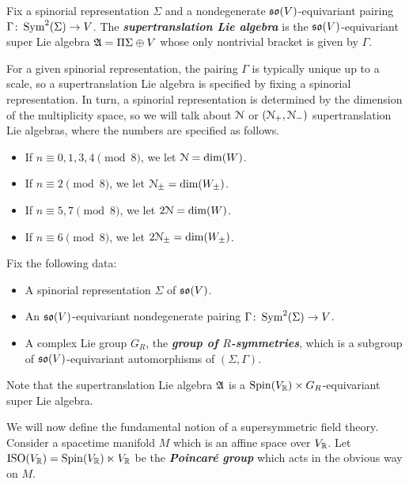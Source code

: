 \documentclass[10pt, oneside]{article}
\newcommand{\defterm}[1]{\textbf{\emph{#1}}}
\begin{document}
\begin{definition}
Fix a spinorial representation $\Sigma$ and a nondegenerate $\mathfrak{so}(V)$-equivariant pairing $\Gamma\colon \operatorname{Sym}^2(\Sigma)\rightarrow V$. The \defterm{supertranslation Lie algebra} is the $\mathfrak{so}(V)$-equivariant super Lie algebra $\mathfrak A = \Pi\Sigma\oplus V$ whose only nontrivial bracket is given by $\Gamma$.
\end{definition}

For a given spinorial representation, the pairing $\Gamma$ is typically unique up to a scale, so a supertranslation Lie algebra is specified by fixing a spinorial representation. In turn, a spinorial representation is determined by the dimension of the multiplicity space, so we will talk about $\mathcal{N}$ or $(\mathcal{N}_+, \mathcal{N}_-)$ supertranslation Lie algebras, where the numbers are specified as follows.
\begin{itemize}
\item If $n\equiv 0, 1, 3, 4\pmod 8$, we let $\mathcal{N} = \dim(W)$.

\item If $n\equiv 2 \pmod 8$, we let $\mathcal{N}_{\pm}=\dim(W_{\pm})$.

\item If $n\equiv 5, 7\pmod 8$, we let $2\mathcal{N} = \dim(W)$.

\item If $n\equiv 6\pmod 8$, we let $2\mathcal{N}_{\pm} = \dim(W_{\pm})$.
\end{itemize}

Fix the following data:
\begin{itemize}
\item A spinorial representation $\Sigma$ of $\mathfrak{so}(V)$.

\item An $\mathfrak{so}(V)$-equivariant nondegenerate pairing $\Gamma\colon \operatorname{Sym}^2(\Sigma)\rightarrow V$.

\item A complex Lie group $G_R$, the \defterm{group of $R$-symmetries}, which is a subgroup of $\mathfrak{so}(V)$-equivariant automorphisms of $(\Sigma, \Gamma)$.
\end{itemize}

Note that the supertranslation Lie algebra $\mathfrak A$ is a $\mathrm{Spin}(V_\mathbb R)\times G_R$-equivariant super Lie algebra.

We will now define the fundamental notion of a supersymmetric field theory.  Consider a spacetime manifold $M$ which is an affine space over $V_\mathbb R$. Let $\mathrm{ISO}(V_\mathbb R) = \mathrm{Spin}(V_\mathbb R)\ltimes V_\mathbb R$ be the \defterm{Poincar\'{e} group} which acts in the obvious way on $M$.
\end{document}
